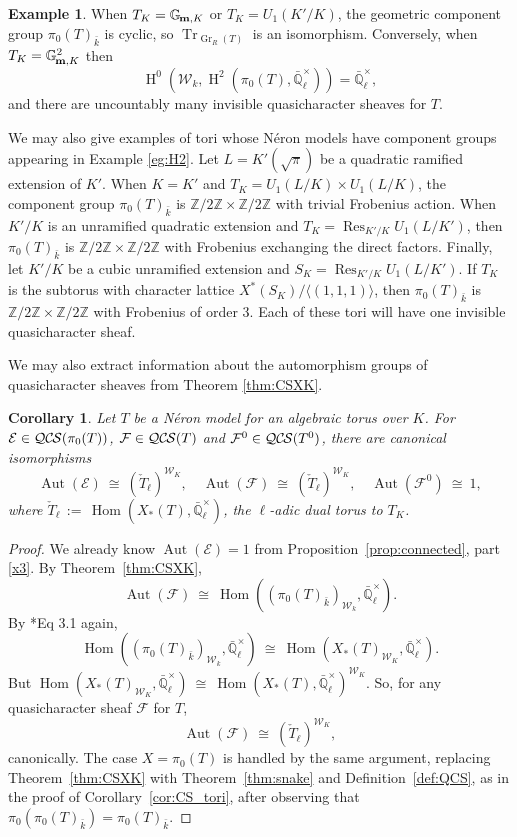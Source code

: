 \documentclass[10pt]{amsart}
\theoremstyle{plain}
\newtheorem{corollary}[theorem]{Corollary}
\theoremstyle{definition}
\newtheorem{example}[theorem]{Example}
\newcommand{\ZZ}{{\mathbb{Z}}}
\newcommand{\EE}{\mathbb{\bar Q}_\ell}
\newcommand{\bFq}{\bar{k}}
\newcommand{\Fq}{k}
\newcommand{\EEx}{\EE^\times}
\newcommand{\Weil}[1]{\mathcal{W}_{#1}}
\newcommand{\Gm}[1]{\mathbb{G}_{\hskip-1pt\textbf{m},#1}}
\DeclareMathOperator{\Aut}{Aut}
\DeclareMathOperator{\Hom}{Hom}
\DeclareMathOperator{\Gr}{Gr}
\DeclareMathOperator{\Hh}{H}
\DeclareMathOperator{\Res}{Res}
\newcommand{\ceq}{{\, :=\, }}
\newcommand{\iso}{{\ \cong\ }}
\newcommand{\TrFrob}[1]{\operatorname{Tr}_{#1}}
\newcommand{\cs}[1]{{\mathcal{#1}}}
\newcommand{\QCS}{{\mathcal{QC\hskip-0.8pt S}}}
\begin{document}
\begin{example}
When $T_K = \Gm{K}$ or $T_K = U_1(K'/K)$, the geometric component group $\pi_0(T)_{\bar{k}}$ is cyclic,
so $\TrFrob{\Gr_R(T)}$ is an isomorphism.  Conversely, when $T_K = \Gm{K}^2$ then
\[
\Hh^0(\Weil{\Fq}, \Hh^2(\pi_0(T), \EEx)) = \EEx,
\]
and there are uncountably many invisible quasicharacter sheaves for $T$.

We may also give examples of tori whose N\'eron models have component groups appearing in Example \ref{eg:H2}.
Let $L = K'(\sqrt{\pi})$ be a quadratic ramified extension of $K'$.  When $K = K'$ and $T_K = U_1(L/K) \times U_1(L/K)$,
the component group $\pi_0(T)_{\bar{k}}$ is $\ZZ/2\ZZ \times \ZZ/2\ZZ$ with trivial Frobenius action.  When $K'/K$ is an unramified
quadratic extension and $T_K = \Res_{K'/K} U_1(L/K')$, then $\pi_0(T)_{\bar{k}}$ is $\ZZ/2\ZZ \times \ZZ/2\ZZ$ with Frobenius
exchanging the direct factors.  Finally, let $K'/K$ be a cubic unramified extension and $S_K = \Res_{K'/K} U_1(L/K')$.  If
$T_K$ is the subtorus with character lattice $X^*(S_K) / \langle (1,1,1) \rangle$, then $\pi_0(T)_{\bar{k}}$ is $\ZZ/2\ZZ \times \ZZ/2\ZZ$
with Frobenius of order $3$.  Each of these tori will have one invisible quasicharacter sheaf.
\end{example}

We may also extract information about the automorphism groups of quasicharacter sheaves from Theorem \ref{thm:CSXK}.

\begin{corollary}
Let $T$ be a N\'eron model for an algebraic torus over $K$.
For $\cs{E}\in \QCS(\pi_0(T))$, $\cs{F}\in {\QCS(T)}$ and $\cs{F}^0\in {\QCS(T^0)}$, there are canonical isomorphisms
\[
\Aut(\cs{E})\iso (\check{T}_\ell)^{\Weil{K}},
\quad
\Aut(\cs{F})\iso (\check{T}_\ell)^{\Weil{K}},
\quad
\Aut(\cs{F}^0)\iso 1,
\]
 where $\check{T}_\ell \ceq \Hom(X_*(T),\EEx)$, the $\ell$-adic dual torus to $T_K$.
\end{corollary}

\begin{proof}
We already know $\Aut(\cs{E}) =1$ from Proposition~\ref{prop:connected}, part \ref{x3}.
By Theorem~\ref{thm:CSXK}, 
\[
\Aut(\cs{F})  \iso \Hom((\pi_0(T)_{\bFq})_{\Weil{\Fq}},\EEx).
\]
By \cite{bitan:discriminant}*{Eq 3.1} again, 
\[
\Hom((\pi_0(T)_{\bFq})_{\Weil{\Fq}},\EEx) \iso
\Hom(X_*(T)_{\Weil{K}},\EEx).
\]
But $\Hom(X_*(T)_{\Weil{K}},\EEx) \iso \Hom(X_*(T),\EEx)^{\Weil{K}}$.
So, for any quasicharacter sheaf $\cs{F}$ for $T$,
\[
\Aut(\cs{F}) \iso (\check{T}_\ell)^{\Weil{K}},
\]
canonically.
The case $X= \pi_0(T)$ is handled by the same argument, replacing Theorem~\ref{thm:CSXK} with
Theorem~\ref{thm:snake} and Definition~\ref{def:QCS}, as in the proof of Corollary~\ref{cor:CS_tori},
after observing that $\pi_0(\pi_0(T)_{\bFq}) = \pi_0(T)_{\bFq}$.
\end{proof}
\end{document}
